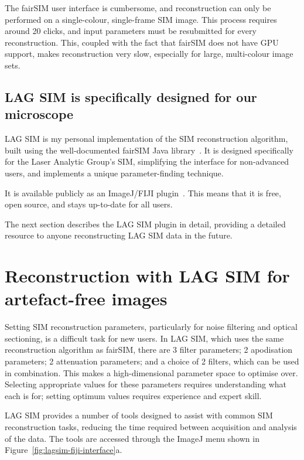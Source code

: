 The fairSIM user interface is cumbersome, and reconstruction can only be performed on a single-colour, single-frame SIM image. 
This process requires around 20 clicks, and input parameters must be resubmitted for every reconstruction. 
This, coupled with the fact that fairSIM does not have GPU support, makes reconstruction very slow, especially for large, multi-colour image sets. 


\subsection{LAG SIM is specifically designed for our microscope}
LAG SIM is my personal implementation of the SIM reconstruction algorithm, built using the well-documented fairSIM Java library~\cite{fairsimGithub}. 
It is designed specifically for the Laser Analytic Group's SIM, simplifying the interface for non-advanced users, and implements a unique parameter-finding technique.

It is available publicly as an ImageJ/FIJI plugin~\cite{lagsim}.
This means that it is free, open source, and stays up-to-date for all users. 

The next section describes the LAG SIM plugin in detail, providing a detailed resource to anyone reconstructing LAG SIM data in the future.

\section{Reconstruction with LAG SIM for artefact-free images} \label{sec:lagsimFiji}


Setting SIM reconstruction parameters, particularly for noise filtering and optical sectioning, is a difficult task for new users.
In LAG SIM, which uses the same reconstruction algorithm as fairSIM, there are 3 filter parameters; 2 apodisation parameters; 2 attenuation parameters; and a choice of 2 filters, which can be used in combination. 
This makes a high-dimensional parameter space to optimise over. 
Selecting appropriate values for these parameters requires understanding what each is for; setting optimum values requires experience and expert skill.

LAG SIM provides a number of tools designed to assist with common SIM reconstruction tasks, reducing the time required between acquisition and analysis of the data.
The tools are accessed through the ImageJ menu shown in Figure~\ref{fig:lagsim-fiji-interface}a. 

